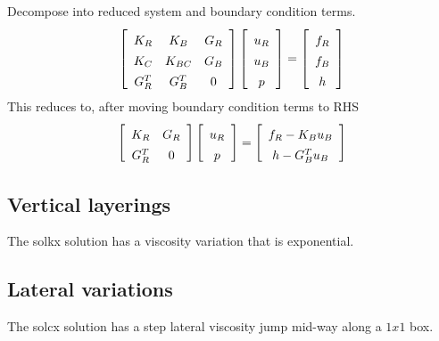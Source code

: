 \documentclass[]{svjour3}
\def\beq{\begin{equation}}
\def\eeq{\end{equation}}
\begin{document}
Decompose into reduced system and boundary condition terms.
\beq
   \left[\begin{array}{ccc}
       K_R & K_B    & G_R \rule{0pt}{13pt}\\
       K_C & K_{BC}  & G_B \rule{0pt}{13pt}\\
       G_R^T & G_B^T & 0 \rule{0pt}{13pt}
   \end{array}\right]
   \left[\begin{array}{c}
u_R  \rule{0pt}{13pt}\\
u_B  \rule{0pt}{13pt}\\
p   \rule{0pt}{13pt}
\end{array}
\right] 
=
\left[\begin{array}{c}
f_R \rule{0pt}{13pt}\\
f_B \rule{0pt}{13pt}\\
h   \rule{0pt}{13pt}
\end{array}
\right]
\eeq
This reduces to, after moving boundary condition terms to RHS
\beq
   \left[\begin{array}{cc}
       K_R   & G_R \rule{0pt}{13pt}\\
       G_R^T & 0 \rule{0pt}{13pt}
   \end{array}\right]
   \left[\begin{array}{c}
u_R  \rule{0pt}{13pt}\\
p   \rule{0pt}{13pt}
\end{array}
\right] 
=
\left[\begin{array}{c}
f_R -K_B u_B\rule{0pt}{13pt}\\
h   -G_B^T u_B\rule{0pt}{13pt}
\end{array}
\right]
\eeq

\subsection{Vertical layerings}
The solkx solution has a viscosity variation that is exponential.



\subsection{Lateral variations}
The solcx solution has a step lateral viscosity jump mid-way along a $1x1$ box.
\end{document}
